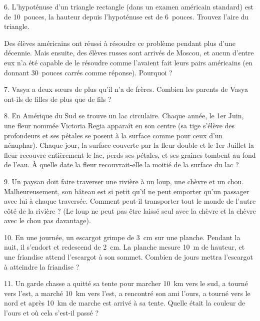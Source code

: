 \begin{problem}{6.}
	L'hypoténuse d'un triangle rectangle (dans un examen américain standard) est de 10~pouces,
	la hauteur depuis l'hypoténuse est de 6~pouces. Trouvez l'aire du triangle.

	Des élèves américains ont réussi à résoudre ce problème pendant plus d'une décennie.
	Mais ensuite, des élèves russes sont arrivés de Moscou, et aucun d'entre eux n'a été capable de le résoudre comme 		l'avaient fait leurs pairs américains
	(en donnant 30~pouces carrés comme réponse). Pourquoi ?
\end{problem}

\begin{problem}{7.}
	Vasya a deux s\oe urs de plus qu'il n'a de frères.
	Combien les parents de Vasya ont-ils de filles de plus que de fils ?
\end{problem}

\begin{problem}{8.}
	En Amérique du Sud se trouve un lac circulaire.
	Chaque année, le 1er Juin, une fleur nommée Victoria Regia
	apparaît en son centre (sa tige s'élève des profondeurs et ses pétales se posent à la surface
	comme pour ceux d'un nénuphar).
	Chaque jour, la surface couverte par la fleur double et le 1er Juillet la fleur recouvre
	entièrement le lac, perds ses pétales, et ses graines tombent au fond de l'eau.
	À quelle date la fleur recouvrait-elle la moitié de la surface du lac ?
\end{problem}

\begin{problem}{9.}
	Un paysan doit faire traverser une rivière à un loup, une chèvre et un chou.
	Malheureusement, son bâteau est si petit qu'il ne peut emporter qu'un passager avec lui à
	chaque traversée.
	Comment peut-il transporter tout le monde de l'autre côté de la rivière ?
	(Le loup ne peut pas être laissé seul avec la chèvre et la chèvre avec le chou pas davantage).
\end{problem}

\begin{problem}{10.}
	En une journée, un escargot grimpe de \SI{3}{\cm} sur une planche.
	Pendant la nuit, il s'endort et redescend de \SI{2}{\cm}.
	La planche mesure \SI{10}{\metre} de hauteur, et une friandise attend l'escargot à son sommet.
	Combien de jours mettra l'escargot à atteindre la friandise ?
\end{problem}

\begin{problem}{11.}
	Un garde chasse a quitté sa tente pour marcher \SI{10}{\km} vers le sud, a tourné vers l'est,
	a marché \SI{10}{\km} vers l'est,
	a rencontré son ami l'ours, a tourné vers le nord et après \SI{10}{\km} de marche est arrivé à sa tente.
	Quelle était la couleur de l'ours et où cela s'est-il passé ?
\end{problem}

